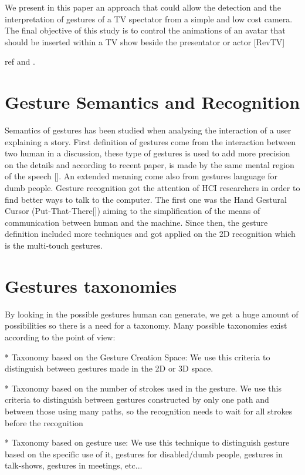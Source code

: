 \documentclass{llncs}
\begin{document}
We present in this paper an approach that could allow the detection and the interpretation of gestures of a TV spectator from a simple and low cost camera. 
The final objective of this study is to control the animations of an avatar that should be inserted within a TV show beside the presentator or actor [RevTV]

ref \cite{Gesturecraft} and \cite{skinColorSeg}.

\section{Gesture Semantics and Recognition}
Semantics of gestures has been studied when analysing the interaction of a user explaining a story. 
First definition of gestures come from the interaction between two human in a discussion, these type of gestures is used to add more precision on the details and according to recent paper, is made by the same mental region of the speech []. An extended meaning come also from gestures language for dumb people.
Gesture recognition got the attention of HCI researchers in order to find better ways to talk to the computer. The first one was the Hand Gestural Cursor (Put-That-There[]) aiming to the simplification of the means of communication between human and the machine.
Since then, the gesture definition included more techniques and got applied on the 2D recognition which is the multi-touch gestures.


\section{Gestures taxonomies}
By looking in the possible gestures human can generate, we get a huge amount of possibilities so there is a need for a taxonomy. Many possible taxonomies exist according to the point of view:

* Taxonomy based on the Gesture Creation Space:
We use this criteria to distinguish between gestures made in the 2D or 3D space.

* Taxonomy based on the number of strokes used in the gesture.
We use this criteria to distinguish between gestures constructed by only one path and between those using many paths, so the recognition needs to wait for all strokes before the recognition

* Taxonomy based on gesture use:
We use this technique to distinguish gesture based on the specific use of it, gestures for disabled/dumb people, gestures in talk-shows, gestures in meetings, etc...
\end{document}
